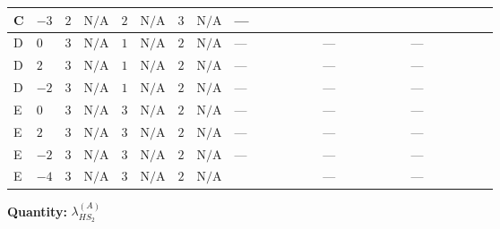 \documentclass[8pt]{article}
\begin{document}
\begin{landscape}
\begin{longtable}{@{}llcccccc >{\raggedright\arraybackslash}p{0.21\linewidth} >{\raggedright\arraybackslash}p{0.21\linewidth} >{\raggedright\arraybackslash}p{0.21\linewidth}@{}}
\midrule
C & $-3$ & $2$ & $\text{N/A}$ & $2$ & $\text{N/A}$ & $3$ & $\text{N/A}$ & --- & \scriptsize\adjustbox{max width=\linewidth}{$\begin{gathered} {\lambda_{HS_2}^{(A)}} (6 \operatorname{Tr}\!\left({Y_d}\,\left({Y_d}\right)^{\dagger}\right)+2 \operatorname{Tr}\!\left({Y_e}\,\left({Y_e}\right)^{\dagger}\right)+6 \operatorname{Tr}\!\left({Y_u}\,\left({Y_u}\right)^{\dagger}\right))\end{gathered}$} & \scriptsize\adjustbox{max width=\linewidth}{$\begin{gathered} +16 {\lambda_5} \left({\lambda_5}\right)^{*}\end{gathered}$} \\
\midrule
D & $0$ & $3$ & $\text{N/A}$ & $1$ & $\text{N/A}$ & $2$ & $\text{N/A}$ & --- & --- & --- \\
\midrule
D & $2$ & $3$ & $\text{N/A}$ & $1$ & $\text{N/A}$ & $2$ & $\text{N/A}$ & --- & --- & --- \\
\midrule
D & $-2$ & $3$ & $\text{N/A}$ & $1$ & $\text{N/A}$ & $2$ & $\text{N/A}$ & --- & --- & --- \\
\midrule
E & $0$ & $3$ & $\text{N/A}$ & $3$ & $\text{N/A}$ & $2$ & $\text{N/A}$ & --- & --- & --- \\
\midrule
E & $2$ & $3$ & $\text{N/A}$ & $3$ & $\text{N/A}$ & $2$ & $\text{N/A}$ & --- & --- & --- \\
\midrule
E & $-2$ & $3$ & $\text{N/A}$ & $3$ & $\text{N/A}$ & $2$ & $\text{N/A}$ & --- & --- & --- \\
\midrule
E & $-4$ & $3$ & $\text{N/A}$ & $3$ & $\text{N/A}$ & $2$ & $\text{N/A}$ & \scriptsize\adjustbox{max width=\linewidth}{$\begin{gathered} +{g_1}^2 \left(-4 {g_2}^2-\frac{15 {\lambda_{HS_2}^{(A)}}}{2}\right)\end{gathered}$} & --- & --- \\
\midrule
\bottomrule
\end{longtable}
\clearpage
\noindent\textbf{Quantity: }$\lambda_{HS_2}^{(A)}$\par\smallskip

\end{landscape}
\end{document}
